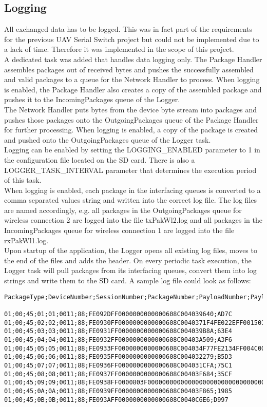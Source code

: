 \subsection{Logging} \label{subsec:txtLoggingTask}
All exchanged data has to be logged. This was in fact part of the requirements for the previous UAV Serial Switch project but could not be implemented due to a lack of time. Therefore it was implemented in the scope of this project.\\
A dedicated task was added that handles data logging only. The Package Handler assembles packages out of received bytes and pushes the successfully assembled and valid packages to a queue for the Network Handler to process. When logging is enabled, the Package Handler also creates a copy of the assembled package and pushes it to the IncomingPackages queue of the Logger.\\
The Network Handler puts bytes from the device byte stream into packages and pushes those packages onto the OutgoingPackages queue of the Package Handler for further processing. When logging is enabled, a copy of the package is created and pushed onto the OutgoingPackages queue of the Logger task.\\
Logging can be enabled by setting the LOGGING\_ENABLED parameter to 1 in the configuration file located on the SD card. There is also a LOGGER\_TASK\_INTERVAL parameter that determines the execution period of this task.\\
When logging is enabled, each package in the interfacing queues is converted to a comma separated values string and written into the correct log file. The log files are named accordingly, e.g. all packages in the OutgoingPackages queue for wireless connection 2 are logged into the file txPakWl2.log and all packages in the IncomingPackages queue for wireless connection 1 are logged into the file rxPakWl1.log.\\
Upon startup of the application, the Logger opens all existing log files, moves to the end of the files and adds the header. On every periodic task execution, the Logger task will pull packages from its interfacing queues, convert them into log strings and write them to the SD card. A sample log file could look as follows:
%
\begin{lstlisting}
PackageType;DeviceNumber;SessionNumber;PackageNumber;PayloadNumber;PayloadSize;CRC8_Header;Payload;CRC16_Payload

01;00;45;01;01;0011;88;FE092DFF0000000000000608C004039640;AD7C
01;00;45;02;02;0011;88;FE0930FF0000000000000608C0040371F4FE022EFF00150100;1245
01;00;45;03;03;0011;88;FE0931FF0000000000000608C004039B8A;63E4
01;00;45;04;04;0011;88;FE0932FF0000000000000608C00403A509;A3F6
01;00;45;05;05;0011;88;FE0933FF0000000000000608C004034F77FE2134FF004C0000;FD86
01;00;45;06;06;0011;88;FE0935FF0000000000000608C004032279;B5D3
01;00;45;07;07;0011;88;FE0936FF0000000000000608C004031CFA;75C1
01;00;45;08;08;0011;88;FE0937FF0000000000000608C00403F684;35CF
01;00;45;09;09;0011;88;FE0938FF0000803F0000000000000000000000000000000000000000;7822
01;00;45;0A;0A;0011;88;FE0939FF0000000000000608C00403F865;1985
01;00;45;0B;0B;0011;88;FE093AFF0000000000000608C0040C6E6;D997
\end{lstlisting}
